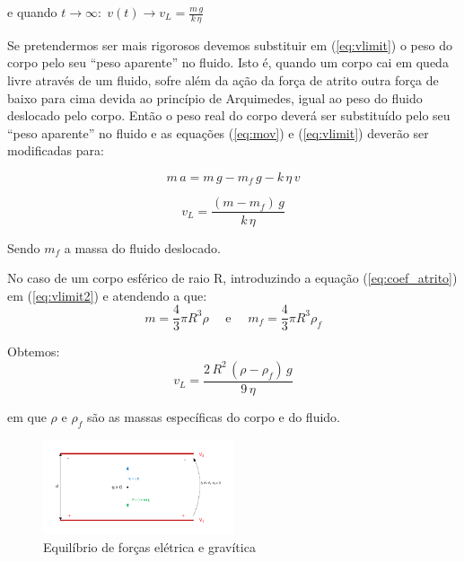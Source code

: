 \documentclass[a4paper,twoside,12pt]{article}      %
\begin{document}
\begin{multicols}{2}

e quando $t \to \infty :\; v(t) \to v_L = \frac{m\,g}{k  \, \eta} $

Se pretendermos ser mais rigorosos devemos substituir  em (\ref{eq:vlimit}) o peso do corpo pelo seu “peso aparente” no fluido. Isto é, quando um corpo cai em queda livre através de um fluido, sofre além da ação da força de atrito outra força de baixo para cima devida ao princípio de Arquimedes, igual ao peso do fluido deslocado pelo corpo. Então o peso real do corpo deverá ser substituído pelo seu “peso aparente” no fluido e as equações (\ref{eq:mov}) e (\ref{eq:vlimit}) deverão ser modificadas para:

\begin{equation}
	\label{eq:mov2}
	m\,a = m\,g - m_f\,g  - k  \, \eta \, v
\end{equation}


\begin{equation}
	\label{eq:vlimit2}
	v_L = \frac{(m - m_f)\,g}{k  \, \eta}
\end{equation}

Sendo $m_f$ a massa do fluido deslocado.

No caso de um corpo esférico de raio R, introduzindo a equação (\ref{eq:coef_atrito}) em (\ref{eq:vlimit2}) e atendendo a que:
\begin{equation*}
	m = \frac{4}{3} \pi R^3 \rho \quad \textrm{  e } \quad  m_f = \frac{4}{3} \pi R^3 \rho_f
\end{equation*}

Obtemos:
\begin{equation}
	\label{eq:vlimit3}
	v_L = \frac{2\,R^2\, (\rho - \rho_f)\,g}{9  \, \eta}
\end{equation}

em que $\rho$  e $\rho_f$ são as massas específicas do corpo e do fluido.

%

\end{multicols}

\begin{figure}
	[tb]  \centering 
	\includegraphics[width=0.5\textwidth]{./F_equil}
	\caption{Equilíbrio de forças elétrica e gravítica \label{fig:f_equil}} 
\end{figure}
\end{document}
